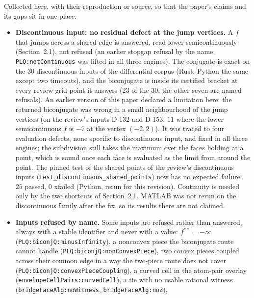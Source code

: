 \documentclass[11pt]{article}
\theoremstyle{definition}
\begin{document}
Collected here, with their reproduction or source, so that the paper's claims
and its gaps sit in one place:
\begin{itemize}[nosep,leftmargin=*]
\item \textbf{Discontinuous input: no residual defect at the jump vertices.}
  A $f$ that jumps across a shared edge is answered, read lower
  semicontinuously (Section~2.1), not refused (an earlier stopgap refusal by the
  name \texttt{PLQ:notContinuous} was lifted in all three engines). The
  conjugate is exact on the $30$ discontinuous inputs of the differential corpus
  (Rust; Python the same except two timeouts), and the biconjugate is inside its
  certified bracket at every review grid point it answers ($23$ of the $30$;
  the other seven are named refusals). An earlier version of this paper declared
  a limitation here: the returned biconjugate was wrong in a small neighbourhood
  of the jump vertices (on the review's inputs D-132 and D-153, $11$ where the
  lower semicontinuous $f$ is $-7$ at the vertex $(-2,2)$). It was traced to four
  evaluation defects, none specific to discontinuous input, and fixed in all
  three engines; the subdivision still takes the maximum over the faces holding
  at a point, which is sound once each face is evaluated as the limit from
  around the point. The pinned test of the shared points of the review's
  discontinuous inputs (\texttt{test\_discontinuous\_shared\_points}) now has
  no expected failure: $25$ passed, $0$ xfailed (Python, rerun for this
  revision). Continuity is needed only by the two shortcuts of
  Section~2.1. MATLAB was not rerun on the discontinuous family after the fix, so
  its results there are not claimed.
\item \textbf{Inputs refused by name.} Some inputs are refused rather than
  answered, always with a stable identifier and never with a value:
  $f^{**}=-\infty$ (\texttt{PLQ:biconjQ:minusInfinity}), a nonconvex piece the
  biconjugate route cannot handle (\texttt{PLQ:biconjQ:nonConvexPiece}), two
  convex pieces coupled across their common edge in a way the two-piece route
  does not cover (\texttt{PLQ:biconjQ:convexPieceCoupling}), a curved cell in the
  atom-pair overlay (\texttt{envelopeCellPairs:curvedCell}), a tie with no usable
  rational witness (\texttt{bridgeFaceAlg:noWitness}, \texttt{bridgeFaceAlg:noZ}),

\end{itemize}
\end{document}
